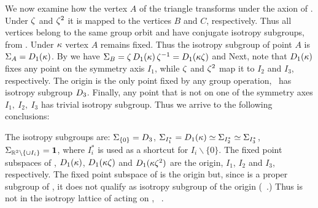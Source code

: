\begin{example}  %

We now examine how the vertex $A$ of the triangle transforms
under the axion of . Under $\zeta$ and $\zeta^2$ it is
mapped to the vertices $B$ and $C$, respectively.
Thus all vertices belong to the same group orbit and have
conjugate isotropy subgroups, from .
Under $\kappa$ vertex $A$ remains fixed. Thus the isotropy
subgroup of point $A$ is $\Sigma_{A}=D_1(\kappa)$. By
 we have $\Sigma_{B}=\zeta\,
D_1(\kappa)\, \zeta^{-1} = D_1(\kappa\zeta)$
and
Next, note that $D_1(\kappa)$ fixes
any point on the symmetry axis $I_1$, while $\zeta$ and
$\zeta^2$ map it to $I_2$ and $I_3$, respectively. The origin
is the only point fixed by any group operation, \ie~has
isotropy subgroup $D_{3}$. Finally, any point that is not on
one of the symmetry axes $I_1,\ I_2,\ I_3$ has trivial isotropy
subgroup. Thus we arrive to the following conclusions:

The isotropy subgroups are: $\Sigma_{\{0\}}=D_{3}$,
$\Sigma_{I_1^*}=D_1(\kappa)\simeq\Sigma_{I_2^*}\simeq\Sigma_{I_3^*}$,
$\Sigma_{\mathbb{R}^{2}\backslash\{\cup I_i\}}=\mathbf{1}$, where $I_i^*$ is
used as a shortcut for $I_i\backslash\{0\}$. The fixed point
subspaces of , $D_1(\kappa)$, $D_1(\kappa\zeta)$ and
$D_1(\kappa\zeta^2)$ are the origin, $I_1$, $I_2$ and $I_3$,
respectively. The fixed point subspace of  is the origin
but, since  is a proper subgroup of , it
does not qualify as isotropy subgroup of the origin
(\cf~.) Thus  is not in the isotropy
lattice of  acting on ,
\cf~.


\end{example}
